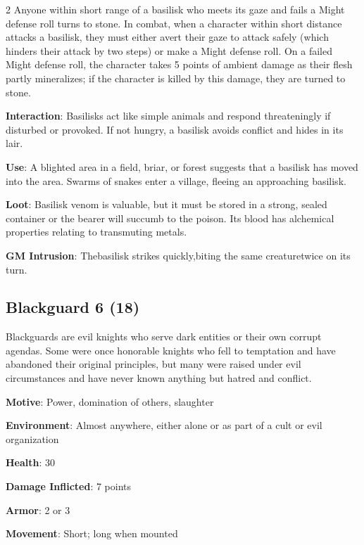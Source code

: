 \begin{multicols}{2}
Anyone within short range of a basilisk who meets its gaze and fails a Might defense roll turns to stone. In combat, when a character within short distance attacks a basilisk, they must either avert their gaze to attack safely (which hinders their attack by two steps) or make a Might defense roll. On a failed Might defense roll, the character takes 5 points of ambient damage as their flesh partly mineralizes; if the character is killed by this damage, they are turned to stone. 

\textbf{Interaction}: Basilisks act like simple animals and respond threateningly if disturbed or provoked. If not hungry, a basilisk avoids conflict and hides in its lair. 

\textbf{Use}: A blighted area in a field, briar, or forest suggests that a basilisk has moved into the area. Swarms of snakes enter a village, fleeing an approaching basilisk. 

\textbf{Loot}: Basilisk venom is valuable, but it must be stored in a strong, sealed container or the bearer will succumb to the poison. Its blood has alchemical properties relating to transmuting metals. 

\textbf{GM Intrusion}: Thebasilisk strikes quickly,biting the same creaturetwice on its turn.

\subsection{Blackguard 6 (18)}

Blackguards are evil knights who serve dark entities or their own corrupt agendas. Some were once honorable knights who fell to temptation and have abandoned their original principles, but many were raised under evil circumstances and have never known anything but hatred and conflict. 

\textbf{Motive}: Power, domination of others, slaughter 

\textbf{Environment}: Almost anywhere, either alone or as part of a cult or evil organization 

\textbf{Health}: 30 

\textbf{Damage Inflicted}: 7 points 

\textbf{Armor}: 2 or 3 

\textbf{Movement}: Short; long when mounted 


\end{multicols}
